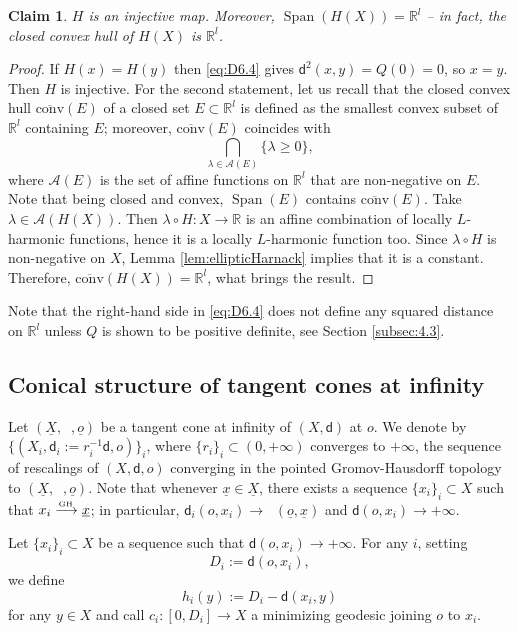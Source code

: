 \documentclass[10pt]{amsart}
\def\To#1{\mathchoice{\xrightarrow{\textstyle\kern4pt#1\kern3pt}}{\stackrel{#1}{\longrightarrow}}{}{}}
\newcommand{\sGH}{{\scriptscriptstyle\mathrm{GH}\,}}
\theoremstyle{plain}
\newtheorem{claim}[theorem]{Claim}
\theoremstyle{definition}
\newcommand{\setR}{\mathbb{R}}
\newcommand{\dist}{\mathsf{d}}
\DeclareMathOperator{\Span}{Span}
\newcommand{\uX}{\underline{X}}
\DeclareMathOperator{\udist}{\underline{\dist}}
\newcommand{\uo}{\underline{o}}
\newcommand{\ux}{\underline{x}}
\begin{document}
\begin{claim}\label{claim}
$H$ is an injective map. Moreover, $\Span(H(X)) = \setR^l$ -- in fact, the closed convex hull of $H(X)$ is $\setR^l$.
\end{claim}

\begin{proof}
If $H(x)=H(y)$ then \eqref{eq:D6.4} gives $\dist^2(x,y)=Q(0)=0$, so $x=y$. Then $H$ is injective. For the second statement, let us recall that the closed convex hull $\overline{\mathrm{conv}}(E)$ of a closed set $E \subset \setR^l$ is defined as the smallest convex subset of $\setR^l$ containing $E$; moreover, $\overline{\mathrm{conv}}(E)$ coincides with
\[
\bigcap_{\lambda \in \mathcal{A}(E)} \{\lambda \ge 0\},
\]
where $\mathcal{A}(E)$ is the set of affine functions on $\setR^l$ that are non-negative on $E$. Note that being closed and convex, $\Span(E)$ contains $\overline{\mathrm{conv}}(E)$. Take $\lambda \in \mathcal{A}(H(X))$. Then $\lambda \circ H: X \to \setR$ is an affine combination of locally $L$-harmonic functions, hence it is a locally $L$-harmonic function too. Since $\lambda \circ H$ is non-negative on $X$, Lemma \ref{lem:ellipticHarnack} implies that it is a constant. Therefore, $\overline{\mathrm{conv}}(H(X))=\setR^l$, what brings the result.
\end{proof}

Note that the right-hand side in \eqref{eq:D6.4} does not define any squared distance on $\setR^l$ unless $Q$ is shown to be positive definite, see Section \ref{subsec:4.3}.

\subsection{Conical structure of tangent cones at infinity}

Let $(\uX,\udist,\uo)$ be a tangent cone at infinity of $(X,\dist)$ at $o$. We denote by $\{(X_i,\dist_i:=r_i^{-1}\dist,o)\}_i$, where $\{r_i\}_i \subset (0,+\infty)$ converges to $+\infty$, the sequence of rescalings of $(X,\dist,o)$ converging in the pointed Gromov-Hausdorff topology to $(\uX,\udist,\uo)$. Note that whenever $\ux \in \uX$, there exists a sequence $\{x_i\}_i\subset X$ such that $x_i \To{\sGH} \ux$; in particular, $\dist_i(o,x_i) \to \udist(\uo,\ux)$ and $\dist(o,x_i)\to +\infty$.


Let $\{x_i\}_i \subset X$ be a sequence such that $\dist(o,x_i) \to +\infty$. For any $i$, setting
\[
D_i:=\dist(o,x_i),
\]
we define
\[
h_i(y):=D_i-\dist(x_i,y)
\]
for any $y \in X$ and call $c_i:[0,D_i] \to X$ a minimizing geodesic joining $o$ to $x_i$.
\end{document}
